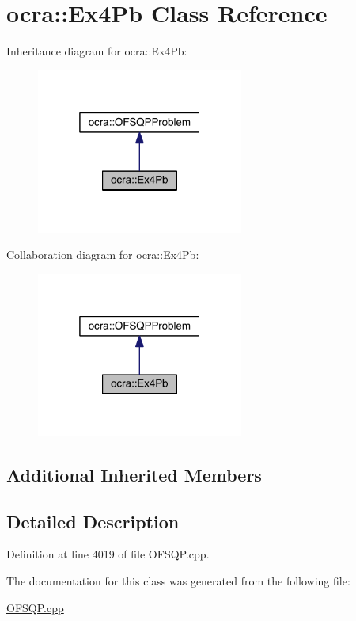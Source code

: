 \hypertarget{classocra_1_1Ex4Pb}{}\section{ocra\+:\+:Ex4\+Pb Class Reference}
\label{classocra_1_1Ex4Pb}


Inheritance diagram for ocra\+:\+:Ex4\+Pb\+:\nopagebreak
\begin{figure}[H]
\begin{center}
\leavevmode
\includegraphics[width=193pt]{d1/d91/classocra_1_1Ex4Pb__inherit__graph}
\end{center}
\end{figure}


Collaboration diagram for ocra\+:\+:Ex4\+Pb\+:\nopagebreak
\begin{figure}[H]
\begin{center}
\leavevmode
\includegraphics[width=193pt]{df/d37/classocra_1_1Ex4Pb__coll__graph}
\end{center}
\end{figure}
\subsection*{Additional Inherited Members}


\subsection{Detailed Description}


Definition at line 4019 of file O\+F\+S\+Q\+P.\+cpp.



The documentation for this class was generated from the following file\+:\begin{DoxyCompactItemize}
\item 
\hyperlink{OFSQP_8cpp}{O\+F\+S\+Q\+P.\+cpp}\end{DoxyCompactItemize}
